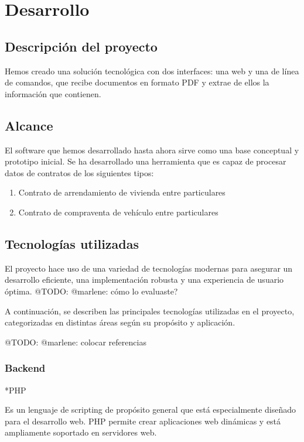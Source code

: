 \chapter{Desarrollo}\label{ch:chapter_3}


\section{Descripción del proyecto}

Hemos creado una solución tecnológica con dos interfaces: una web y una de línea de comandos, que recibe documentos
en formato PDF y extrae de ellos la información que contienen.


\section{Alcance}

El software que hemos desarrollado hasta ahora sirve como una base conceptual y prototipo inicial.
Se ha desarrollado una herramienta que es capaz de procesar datos de contratos de los siguientes tipos:

\begin{enumerate}
    \item Contrato de arrendamiento de vivienda entre particulares
    \item Contrato de compraventa de vehículo entre particulares
\end{enumerate}


\section{Tecnologías utilizadas}
El proyecto hace uso de una variedad de tecnologías modernas para asegurar un desarrollo eficiente,
una implementación robusta y una experiencia de usuario óptima.
\colorbox{color_highlight}{@TODO: @marlene:} cómo lo evaluaste?

A continuación, se describen las principales tecnologías utilizadas en
el proyecto, categorizadas en distintas áreas según su propósito y aplicación.

\colorbox{color_highlight}{@TODO: @marlene:} colocar referencias

\subsection{Backend}

*PHP

Es un lenguaje de scripting de propósito general que está especialmente diseñado para el desarrollo web.
PHP permite crear aplicaciones web dinámicas y está ampliamente soportado en servidores web.

